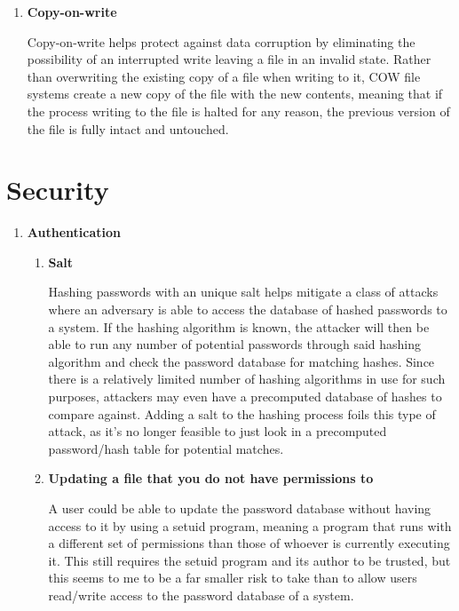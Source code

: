 \documentclass{article}
\begin{document}
\begin{enumerate}
    \item \textbf{Copy-on-write}

          Copy-on-write helps protect against data corruption by eliminating the possibility of an interrupted write leaving a file in an invalid state. Rather than overwriting the existing copy of a file when writing to it, COW file systems create a new copy of the file with the new contents, meaning that if the process writing to the file is halted for any reason, the previous version of the file is fully intact and untouched.
\end{enumerate}

\section{Security}

\begin{enumerate}
    \item \textbf{Authentication}
          \begin{enumerate}
              \item \textbf{Salt} 

                    Hashing passwords with an unique salt helps mitigate a class of attacks where an adversary is able to access the database of hashed passwords to a system. If the hashing algorithm is known, the attacker will then be able to run any number of potential passwords through said hashing algorithm and check the password database for matching hashes. Since there is a relatively limited number of hashing algorithms in use for such purposes, attackers may even have a precomputed database of hashes to compare against. Adding a salt to the hashing process foils this type of attack, as it's no longer feasible to just look in a precomputed password/hash table for potential matches.

              \item \textbf{Updating a file that you do not have permissions to}

                    A user could be able to update the password database without having access to it by using a setuid program, meaning a program that runs with a different set of permissions than those of whoever is currently executing it. This still requires the setuid program and its author to be trusted, but this seems to me to be a far smaller risk to take than to allow users read/write access to the password database of a system.
          \end{enumerate}


\end{enumerate}
\end{document}
